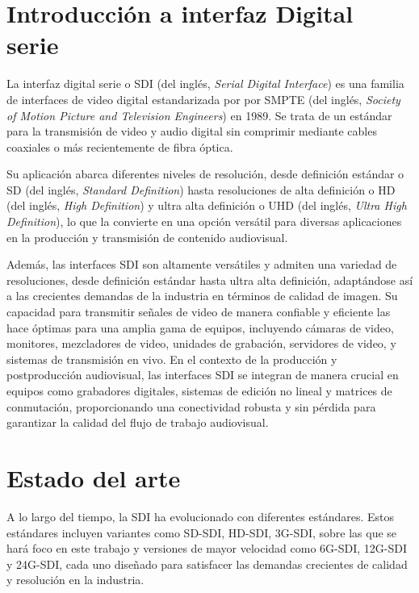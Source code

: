 \section{Introducción a interfaz Digital serie}

La interfaz digital serie o SDI (del inglés, \textit{Serial Digital Interface})
es una familia de interfaces de video digital estandarizada por
por SMPTE\citep{smpte} (del inglés, \textit{Society of Motion Picture and Television Engineers}) en
1989. Se trata de un estándar para la transmisión de video y audio digital sin
comprimir mediante cables coaxiales o más recientemente de fibra óptica.

Su aplicación abarca diferentes niveles de resolución, desde definición
estándar o SD (del inglés, \textit{Standard Definition}) hasta resoluciones de
alta definición o HD (del inglés, \textit{High Definition}) y ultra alta
definición o UHD (del inglés, \textit{Ultra High Definition}), lo que la convierte
en una opción versátil para diversas aplicaciones en la producción y transmisión
de contenido audiovisual.

Además, las interfaces SDI son altamente versátiles y admiten una variedad de
resoluciones, desde definición estándar hasta ultra alta definición, adaptándose
así a las crecientes demandas de la industria en términos de calidad de imagen.
Su capacidad para transmitir señales de video de manera confiable y eficiente
las hace óptimas para una amplia gama de equipos, incluyendo cámaras de video,
monitores, mezcladores de video, unidades de grabación, servidores de video, y
sistemas de transmisión en vivo. En el contexto de la producción y
postproducción audiovisual, las interfaces SDI se integran de manera crucial en
equipos como grabadores digitales, sistemas de edición no lineal y matrices de
conmutación, proporcionando una conectividad robusta y sin pérdida para
garantizar la calidad del flujo de trabajo audiovisual.

\section{Estado del arte}

A lo largo del tiempo, la SDI ha evolucionado con diferentes estándares. Estos
estándares incluyen variantes como SD-SDI, HD-SDI, 3G-SDI, sobre las que se
hará foco en este trabajo y versiones de mayor velocidad como 6G-SDI, 12G-SDI
y 24G-SDI, cada uno diseñado para satisfacer las demandas crecientes de calidad
y resolución en la industria.

